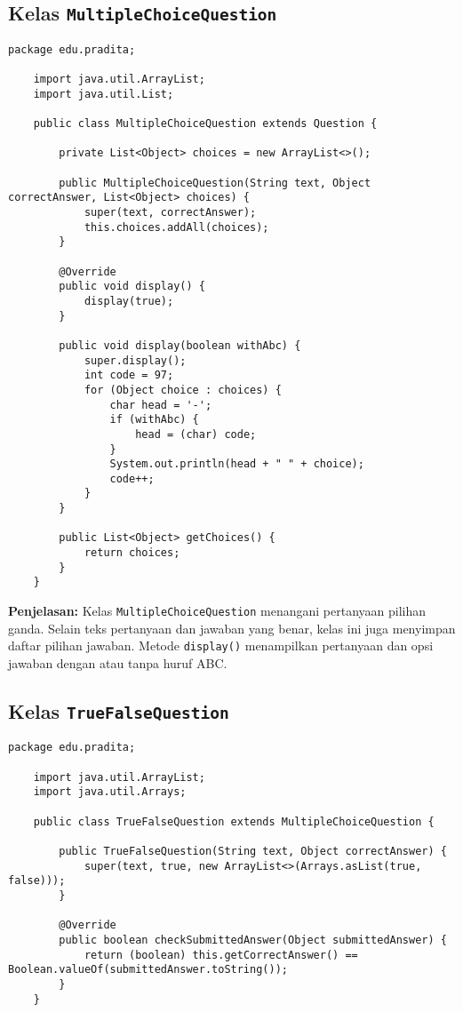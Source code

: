 \subsection{Kelas \texttt{MultipleChoiceQuestion}}

\begin{lstlisting}[style=JavaStyle]
	package edu.pradita;
	
	import java.util.ArrayList;
	import java.util.List;
	
	public class MultipleChoiceQuestion extends Question {
		
		private List<Object> choices = new ArrayList<>();
		
		public MultipleChoiceQuestion(String text, Object correctAnswer, List<Object> choices) {
			super(text, correctAnswer);
			this.choices.addAll(choices);
		}
		
		@Override
		public void display() {
			display(true);
		}
		
		public void display(boolean withAbc) {
			super.display();
			int code = 97;
			for (Object choice : choices) {
				char head = '-';
				if (withAbc) {
					head = (char) code;
				}
				System.out.println(head + " " + choice);
				code++;
			}
		}
		
		public List<Object> getChoices() {
			return choices;
		}
	}
\end{lstlisting}

\textbf{Penjelasan:} Kelas \texttt{MultipleChoiceQuestion} menangani pertanyaan pilihan ganda. Selain teks pertanyaan dan jawaban yang benar, kelas ini juga menyimpan daftar pilihan jawaban. Metode \texttt{display()} menampilkan pertanyaan dan opsi jawaban dengan atau tanpa huruf ABC.

\subsection{Kelas \texttt{TrueFalseQuestion}}

\begin{lstlisting}[style=JavaStyle]
	package edu.pradita;
	
	import java.util.ArrayList;
	import java.util.Arrays;
	
	public class TrueFalseQuestion extends MultipleChoiceQuestion {
		
		public TrueFalseQuestion(String text, Object correctAnswer) {
			super(text, true, new ArrayList<>(Arrays.asList(true, false)));
		}
		
		@Override
		public boolean checkSubmittedAnswer(Object submittedAnswer) {
			return (boolean) this.getCorrectAnswer() == Boolean.valueOf(submittedAnswer.toString());
		}
	}
\end{lstlisting}

